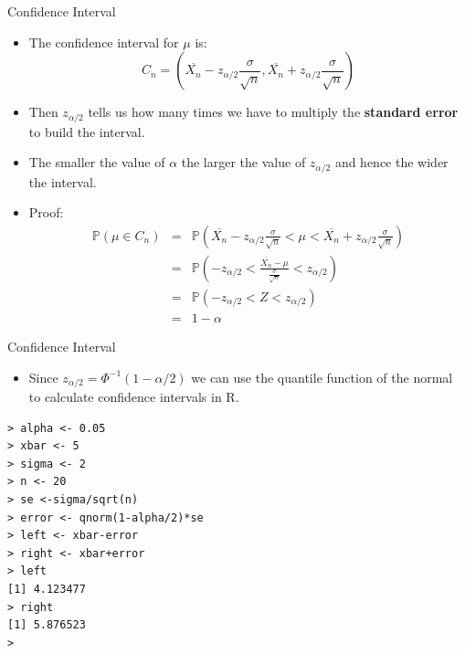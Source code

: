 \documentclass[handout]{beamer}
\begin{document}
\begin{frame}{Confidence Interval}
\scriptsize{
\begin{itemize}
 \item  The confidence interval for $\mu$ is:
 \begin{displaymath}
 C_n = (\overline{X_{n}}-z_{\alpha/2}\frac{\sigma}{\sqrt{n}} , \overline{X_{n}} + z_{\alpha/2}\frac{\sigma}{\sqrt{n}}) 
 \end{displaymath}
\item Then $ z_{\alpha/2}$ tells us how many times we have to multiply the \textbf{standard error} to build the interval.
\item The smaller the value of $\alpha$ the larger the value of $ z_{\alpha/2}$ and hence the wider the interval.  
\item Proof:
 \begin{eqnarray*}
 \mathbb{P}(\mu \in C_n) & = & \mathbb{P}(\overline{X_{n}}-z_{\alpha/2}\frac{\sigma}{\sqrt{n}} < \mu < \overline{X_{n}} + z_{\alpha/2}\frac{\sigma}{\sqrt{n}}) \nonumber \\ 
                         & = & \mathbb{P}(-z_{\alpha/2} < \frac{\overline{X_{n}}-\mu}{\frac{\sigma}{\sqrt{n}}} <  z_{\alpha/2}) \nonumber \\ 
			  & = & \mathbb{P}(-z_{\alpha/2} < Z <  z_{\alpha/2}) \nonumber \\
			   & = & 1-\alpha 
 \end{eqnarray*}


\end{itemize}
}


 
\end{frame}

\begin{frame}[fragile]{Confidence Interval}

\scriptsize{
\begin{itemize}
 \item Since $z_{\alpha/2} = \Phi^{-1}(1-\alpha/2)$ we can use the quantile function of the normal to calculate confidence intervals in R.
\end{itemize}


\begin{verbatim}
> alpha <- 0.05
> xbar <- 5
> sigma <- 2
> n <- 20
> se <-sigma/sqrt(n)
> error <- qnorm(1-alpha/2)*se
> left <- xbar-error
> right <- xbar+error
> left
[1] 4.123477
> right
[1] 5.876523
>
\end{verbatim}
}



\end{frame}
\end{document}
